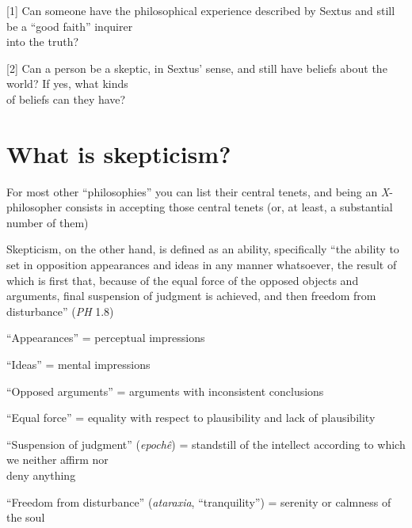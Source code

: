 \documentclass[11pt]{article}
\begin{document}
[1] Can someone have the philosophical experience described by Sextus and still be a ``good faith'' inquirer\\\hspace*{12mm}into the truth?
\vspace*{1mm}

[2] Can a person be a skeptic, in Sextus' sense, and still have beliefs about the world? If yes, what kinds\\\hspace*{12mm}of beliefs can they have?
\vspace*{-3mm}

\section*{What is skepticism?}

\noindent For most other ``philosophies'' you can list their central tenets, and being an \emph{X}-philosopher consists in accepting those central tenets (or, at least, a substantial number of them)
\vspace*{2mm}

\noindent Skepticism, on the other hand, is defined as an ability, specifically ``the ability to set in opposition appearances and ideas in any manner whatsoever, the result of which is first that, because of the equal force of the opposed objects and arguments, final suspension of judgment is achieved, and then freedom from disturbance'' (\emph{PH} 1.8)
\vspace*{2mm}

``Appearances'' = perceptual impressions
\vspace*{1mm}

``Ideas'' = mental impressions
\vspace*{1mm}

``Opposed arguments'' = arguments with inconsistent conclusions
\vspace*{1mm}

``Equal force'' = equality with respect to plausibility and lack of plausibility
\vspace*{1mm}

``Suspension of judgment'' (\emph{epoch\^{e}}) = standstill of the intellect according to which we neither affirm nor\\\hspace*{7mm}deny anything
\vspace*{1mm}

``Freedom from disturbance'' (\emph{ataraxia}, ``tranquility'') = serenity or calmness of the soul
\end{document}
